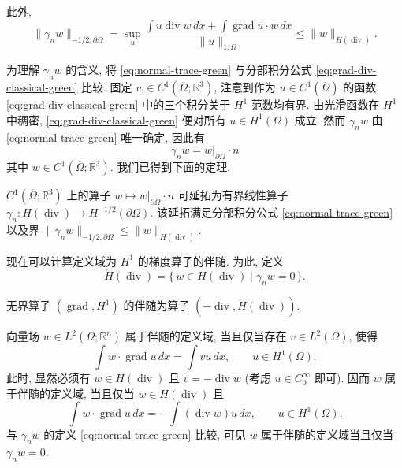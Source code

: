 {此外,}
\[
\|\gamma_n w\|_{-1/2,\partial\Omega}=\sup_u\frac{\int u\operatorname{div}w\,dx+\int\operatorname{grad}u\cdot w\,dx}{\|u\|_{1,\Omega}}\leq\|w\|_{H(\operatorname{div})}.
\]

{为理解 $\gamma_n w$ 的含义, 将 \eqref{eq:normal-trace-green} 与分部积分公式 \eqref{eq:grad-div-classical-green} 比较. 固定 $w\in C^1(\overline\Omega;\mathbb R^3)$, 注意到作为 $u\in C^1(\overline\Omega)$ 的函数, \eqref{eq:grad-div-classical-green} 中的三个积分关于 $H^1$ 范数均有界. 由光滑函数在 $H^1$ 中稠密, \eqref{eq:grad-div-classical-green} 便对所有 $u\in H^1(\Omega)$ 成立. 然而 $\gamma_n w$ 由 \eqref{eq:normal-trace-green} 唯一确定, 因此有}
\[
\gamma_n w=w|_{\partial\Omega}\cdot n
\]
{其中 $w\in C^1(\overline\Omega;\mathbb R^3)$. 我们已得到下面的定理.}


\begin{Theorem}\label{thm:normal-trace-extension}
{$C^1(\overline\Omega;\mathbb R^3)$ 上的算子 $w\mapsto w|_{\partial\Omega}\cdot n$ 可延拓为有界线性算子 $\gamma_n:H(\operatorname{div})\to H^{-1/2}(\partial\Omega)$. 该延拓满足分部积分公式 \eqref{eq:normal-trace-green} 以及界 $\|\gamma_n w\|_{-1/2,\partial\Omega}\leq\|w\|_{H(\operatorname{div})}$.}
\end{Theorem}

{现在可以计算定义域为 $H^1$ 的梯度算子的伴随. 为此, 定义}
\[
\mathring H(\operatorname{div})=\{\,w\in H(\operatorname{div})\mid\gamma_n w=0\,\}.
\]


\begin{Theorem}\label{thm:gradient-adjoint-zero-normal}
{无界算子 $(\operatorname{grad},H^1)$ 的伴随为算子 $(-\operatorname{div},\mathring H(\operatorname{div}))$.}
\end{Theorem}

\begin{Proof}
{向量场 $w\in L^2(\Omega;\mathbb R^n)$ 属于伴随的定义域, 当且仅当存在 $v\in L^2(\Omega)$, 使得}
\[
\int w\cdot\operatorname{grad}u\,dx=\int vu\,dx,\qquad u\in H^1(\Omega).
\]
{此时, 显然必须有 $w\in H(\operatorname{div})$ 且 $v=-\operatorname{div}w$ (考虑 $u\in C_0^\infty$ 即可). 因而 $w$ 属于伴随的定义域, 当且仅当 $w\in H(\operatorname{div})$ 且}
\[
\int w\cdot\operatorname{grad}u\,dx=-\int(\operatorname{div}w)u\,dx,\qquad u\in H^1(\Omega).
\]
{与 $\gamma_n w$ 的定义 \eqref{eq:normal-trace-green} 比较, 可见 $w$ 属于伴随的定义域当且仅当 $\gamma_n w=0$.}
\end{Proof}

